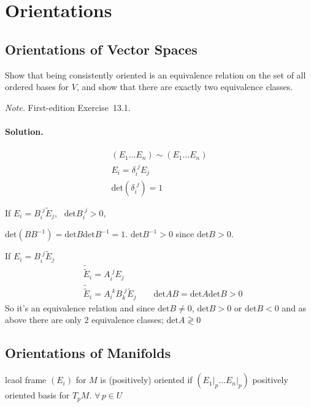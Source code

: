 \section{Orientations}
\subsection*{ Orientations of Vector Spaces }

\begin{exercise}
Show that being consistently oriented is an equivalence relation on the set of all ordered bases for $V$, and show that there are exactly two equivalence classes.
\end{exercise}
\noindent\emph{Note.} First-edition Exercise~13.1.
\paragraph{Solution.} 
\[
\begin{gathered}
  (E_1 \dots E_n) \sim (E_1 \dots E_n) \\ 
  E_i = \delta_i^{\, \, j } E_j \\ 
  \text{det}{ (\delta_i^{\, \, j} )} = 1 
\end{gathered}
\]

If $E_i = B_i^{\, \, j} \widetilde{E}_j$, \, $\text{det}{B_i^{\, \, j }} >0$,  

$\text{det}{(BB^{-1})} = \text{det}{B} \text{det}{B^{-1}} = 1$.  $\text{det}{B^{-1}} >0$ since $\text{det}{B} >0$.  

If $E_i = B_i^{\, \, j} \widetilde{E}_j$  
\[
\begin{aligned}
  & \widetilde{ \widetilde{E}}_i = A_i^{\, \, j} E_j \\ 
  & \widetilde{ \widetilde{E}}_i = A_i^{\, \, k } B_k^{\, \, j} \widetilde{E}_j \quad \quad \text{det}{AB} = \text{det}{A} \text{det}{B} >0
\end{aligned}
\]
So it's an equivalence relation and since $\text{det}{B} \neq 0$, $\text{det}{B} >0$ or $\text{det}{B} <0$ and as above there are only 2 equivalence classes; $\text{det}{A} \gtrless 0$

\subsection*{ Orientations of Manifolds }

lcaol frame $(E_i)$ for $M$ is (positively) oriented if $(\left. E_1 \right|_p \dots \left. E_n \right|_p)$ positively oriented basis for $T_pM$.  $\forall \, p \in U$  

